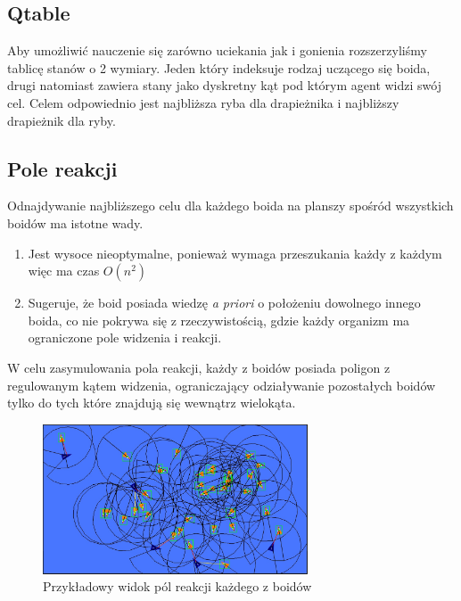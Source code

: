 \documentclass{article}
\begin{document}
\subsection{Qtable}
Aby umożliwić nauczenie się zarówno uciekania jak i gonienia rozszerzyliśmy tablicę stanów o 2 wymiary. Jeden który indeksuje rodzaj uczącego się boida, drugi natomiast zawiera stany jako dyskretny kąt pod którym agent widzi swój cel. Celem odpowiednio jest najbliższa ryba dla drapieżnika i najbliższy drapieżnik dla ryby.
\subsection{Pole reakcji}
Odnajdywanie najbliższego celu dla każdego boida na planszy spośród wszystkich boidów ma istotne wady.
\begin{enumerate}
    \item Jest wysoce nieoptymalne, ponieważ wymaga przeszukania każdy z każdym więc ma czas \(O(n^2)\)
    \item Sugeruje, że boid posiada wiedzę \textit{a priori} o położeniu dowolnego innego boida, co nie pokrywa się z rzeczywistością, gdzie każdy organizm ma ograniczone pole widzenia i reakcji.
\end{enumerate}
W celu zasymulowania pola reakcji, każdy z boidów posiada poligon z regulowanym kątem widzenia, ograniczający odziaływanie pozostałych boidów tylko do tych które znajdują się wewnątrz wielokąta.
\begin{figure}[h]
    \centering
    \includegraphics[width=0.7\textwidth]{12_hunting_debug.jpg}
    \caption{Przykładowy widok pól reakcji każdego z boidów}
\end{figure}
\end{document}
